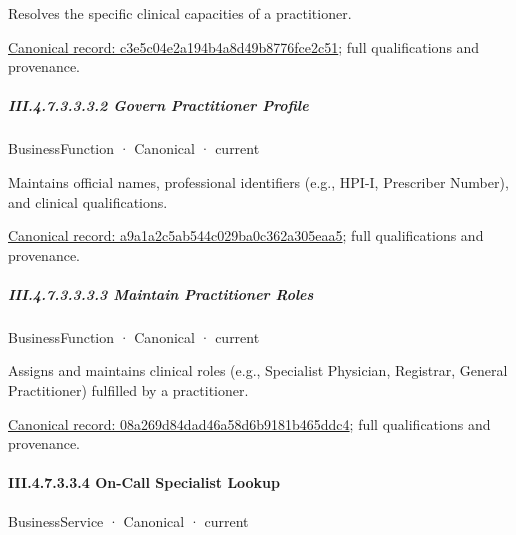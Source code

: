 Resolves the specific clinical capacities of a practitioner.


{\footnotesize \href{../../../../../../../../continuum/business/business-service/c3e5c04e2a194b4a8d49b8776fce2c51.md}{Canonical record: c3e5c04e2a194b4a8d49b8776fce2c51}; full qualifications and provenance.}\par
\subparagraph*{III.4.7.3.3.3.2 Govern Practitioner Profile}
\label{navigation:III.4.7.3.3.3.2}

\label{element:a9a1a2c5ab544c029ba0c362a305eaa5}
{\small BusinessFunction · Canonical · current}\par

Maintains official names, professional identifiers (e.g., HPI-I, Prescriber Number), and clinical qualifications.


{\footnotesize \href{../../../../../../../../continuum/business/business-function/a9a1a2c5ab544c029ba0c362a305eaa5.md}{Canonical record: a9a1a2c5ab544c029ba0c362a305eaa5}; full qualifications and provenance.}\par
\subparagraph*{III.4.7.3.3.3.3 Maintain Practitioner Roles}
\label{navigation:III.4.7.3.3.3.3}

\label{element:08a269d84dad46a58d6b9181b465ddc4}
{\small BusinessFunction · Canonical · current}\par

Assigns and maintains clinical roles (e.g., Specialist Physician, Registrar, General Practitioner) fulfilled by a practitioner.


{\footnotesize \href{../../../../../../../../continuum/business/business-function/08a269d84dad46a58d6b9181b465ddc4.md}{Canonical record: 08a269d84dad46a58d6b9181b465ddc4}; full qualifications and provenance.}\par
\paragraph*{III.4.7.3.3.4 On-Call Specialist Lookup}
\label{navigation:III.4.7.3.3.4}

\label{element:e0ba307dc51e47a395c1eac9fe728a98}
{\small BusinessService · Canonical · current}\par

